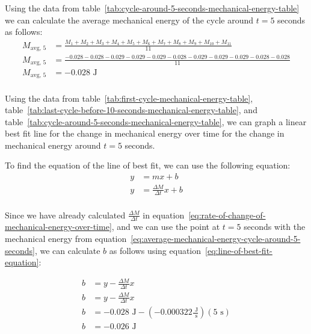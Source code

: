 \documentclass{article}
\begin{document}
            Using the data from table~\ref{tab:cycle-around-5-seconds-mechanical-energy-table} we can calculate the average mechanical energy of the cycle around $t=5$ seconds as follows:
            \begin{equation}
                \begin{aligned}
                    M_{\text{avg, 5}} &= \frac{M_1 + M_2 + M_3 + M_4 + M_5 + M_6 + M_7 + M_8 + M_9 + M_{10} + M_{11}}{11} \\
                    M_{\text{avg, 5}} &= \frac{-0.028 -0.028 -0.029 -0.029 -0.029 -0.028 -0.029 -0.029 -0.029 -0.028 -0.028}{11} \\
                    M_{\text{avg, 5}} &= -0.028 \text{ J} \\
                \end{aligned}\label{eq:average-mechanical-energy-cycle-around-5-seconds}
            \end{equation}
            
            Using the data from table~\ref{tab:first-cycle-mechanical-energy-table}, table~\ref{tab:last-cycle-before-10-seconds-mechanical-energy-table}, and table~\ref{tab:cycle-around-5-seconds-mechanical-energy-table}, we can graph a linear best fit line for the change in mechanical energy over time for the change in mechanical energy around $t = 5$ seconds.
            
            To find the equation of the line of best fit, we can use the following equation:
            \begin{equation}
                \begin{aligned}
                    y &= mx + b \\
                    y &= \frac{\Delta M}{\Delta t}x + b \\
                \end{aligned}\label{eq:line-of-best-fit-equation}
            \end{equation}
            
            Since we have already calculated $\frac{\Delta M}{\Delta t}$ in equation~\ref{eq:rate-of-change-of-mechanical-energy-over-time}, and we can use the point at $t = 5$ seconds with the mechanical energy from equation~\ref{eq:average-mechanical-energy-cycle-around-5-seconds}, we can calculate $b$ as follows using equation~\ref{eq:line-of-best-fit-equation}:
            
            \begin{equation}
                \begin{aligned}
                    b &= y - \frac{\Delta M}{\Delta t}x \\
                    b &= y - \frac{\Delta M}{\Delta t}x \\
                    b &= -0.028 \text{ J} - (-0.000322 \frac{\text{ J}}{\text{ s}})(5 \text{ s}) \\
                    b &= -0.026 \text{ J} \\
                \end{aligned}\label{eq:line-of-best-fit-b}
            \end{equation}
            
\end{document}
